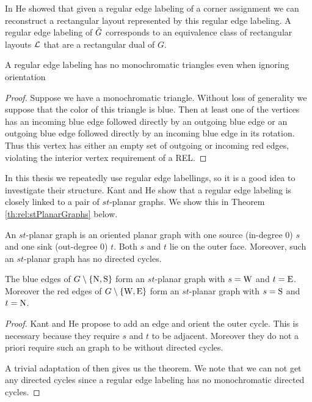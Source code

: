   In \cite{He1993} He showed that given a regular edge labeling of a corner assignment we can reconstruct a rectangular layout represented by this regular edge labeling.
  A regular edge labeling  of $\bar{G}$ corresponds to an equivalence class of rectangular layouts $\mathcal{L}$ that are a rectangular dual of $G$.

  \begin{lemma}
    \label{lm:rel:noMonoColoredTriangles}
    A regular edge labeling has no monochromatic triangles even when ignoring orientation
  \end{lemma}

  \begin{proof}
    Suppose we have a monochromatic triangle. Without loss of generality we suppose that the color of this triangle is blue. Then at least one of the vertices has an incoming blue edge followed directly by an outgoing blue edge or an outgoing blue edge followed directly by an incoming blue edge in its rotation. Thus this vertex has either an empty set of outgoing or incoming red edges, violating the interior vertex requirement of a REL.
  \end{proof}

    In this thesis we repeatedly use regular edge labellings, so it is a good idea to investigate their structure.
    Kant and He \cite{Kant1997} show that a regular edge labeling is closely linked to a pair of $st$-planar graphs. We show this in Theorem \ref{th:rel:stPlanarGraphs} below.

    An $st$-planar graph is an oriented planar graph with one source (in-degree 0) $s$ and one sink (out-degree 0) $t$. Both $s$ and $t$ lie on the outer face. Moreover, such an $st$-planar graph has no directed cycles.

    \begin{thrm}
      \label{th:rel:stPlanarGraphs}
      The blue edges of $G\setminus \left\lbrace {\mathrm{N},\mathrm{S}} \right\rbrace$ form an $st$-planar graph with $s= \mathrm{W}$ and $t=\mathrm{E}$. Moreover the red edges of $G\setminus \left\lbrace {\mathrm{W},\mathrm{E}} \right\rbrace$ form an $st$-planar graph with $s= \mathrm{S}$ and $t= \mathrm{N}$.
    \end{thrm}
    \begin{proof}
      Kant and He propose to add an edge and orient the outer cycle. This is necessary because they require $s$ and $t$ to be adjacent. Moreover they do not a priori require such an graph to be without directed cycles.

      A trivial adaptation of \cite[pp.179]{Kant1997} then gives us the theorem. We note that we can not get any directed cycles since a regular edge labeling has no monochromatic directed cycles.
    \end{proof}

